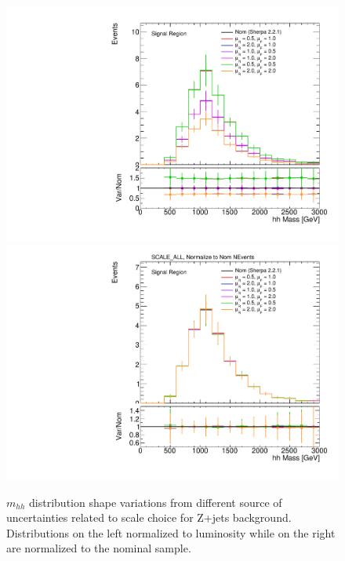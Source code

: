 \begin{figure}[!htbp]
\begin{center}
\includegraphics[scale=0.33]{./figures/boosted/systematics/zjets_alt_hhMass_SR_syst_SCALE_ALL_UnNormalized}
\includegraphics[scale=0.33]{./figures/boosted/systematics/zjets_alt_hhMass_SR_syst_SCALE_ALL}
\caption{$m_{hh}$ distribution shape variations from different source of uncertainties related 
to scale choice for Z+jets background. Distributions on the left normalized to luminosity while on 
the right are normalized to the nominal sample.}
\label{fig:boosted_systematics_zjets_sr_scale}
\end{center}
\end{figure}

